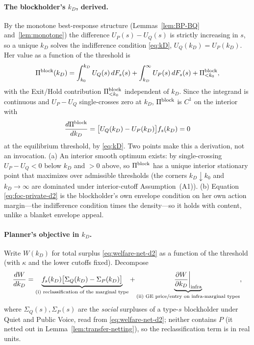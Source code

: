 \documentclass[11pt]{article}
\newcommand{\1}{\mathbf{1}}
\begin{document}
\paragraph{The blockholder's $k_D$, derived.}
By the monotone best-response structure (Lemmas~\ref{lem:BP-BQ} and~\ref{lem:monotone}) the difference $U_P(s)-U_Q(s)$ is strictly
increasing in $s$, so a unique $k_D$ solves the indifference condition
\eqref{eq:kD}, $U_Q(k_D)=U_P(k_D)$. Her value as a function of the threshold is
\begin{equation}
\Pi^{\textup{block}}(k_D)=\int_{k_0}^{k_D}U_Q(s)\,dF_s(s)
   +\int_{k_D}^{\infty}U_P(s)\,dF_s(s)+\Pi^{\textup{block}}_{<k_0},
\label{eq:Piblock-kD}
\end{equation}
with the Exit/Hold contribution $\Pi^{\textup{block}}_{<k_0}$ independent of
$k_D$. Since the integrand is continuous and $U_P-U_Q$ single-crosses zero at
$k_D$, $\Pi^{\textup{block}}$ is $C^1$ on the interior with
\begin{equation}
\frac{d\Pi^{\textup{block}}}{dk_D}
 =\big[U_Q(k_D)-U_P(k_D)\big]f_s(k_D)=0
\label{eq:foc-private-d2}
\end{equation}
at the equilibrium threshold, by \eqref{eq:kD}. Two points make this a
derivation, not an invocation. (a) An interior smooth optimum exists: by
single-crossing $U_P-U_Q<0$ below $k_D$ and $>0$ above, so
$\Pi^{\textup{block}}$ has a unique interior stationary point that maximizes over
admissible thresholds (the corners $k_D\!\downarrow\!k_0$ and $k_D\!\to\!\infty$
are dominated under interior-cutoff Assumption~\textup{(A1)}). (b) Equation
\eqref{eq:foc-private-d2} is the blockholder's own envelope condition on her own
action margin---the indifference condition times the density---so it holds with
content, unlike a blanket envelope appeal.

\paragraph{Planner's objective in $k_D$.}
Write $W(k_D)$ for total surplus \eqref{eq:welfare-net-d2} as a function of the
threshold (with $\kappa$ and the lower cutoffs fixed). Decompose
\begin{equation}
\frac{dW}{dk_D}
 =\underbrace{f_s(k_D)\big[\Sigma_Q(k_D)-\Sigma_P(k_D)\big]}_{\text{(i) reclassification of the marginal type}}
 +\underbrace{\frac{\partial W}{\partial k_D}\bigg|_{\textup{infra}}}_{\text{(ii) GE price/entry on infra-marginal types}},
\label{eq:foc-planner-d2}
\end{equation}
where $\Sigma_Q(s),\Sigma_P(s)$ are the \emph{social} surpluses of a type-$s$
blockholder under Quiet and Public Voice, read from \eqref{eq:welfare-net-d2};
neither contains $P$ (it netted out in Lemma~\ref{lem:transfer-netting}), so the
reclassification term is in real units.
\end{document}
